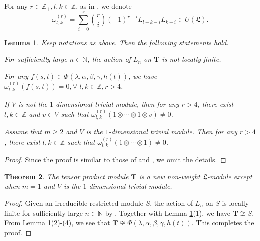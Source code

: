 \documentclass[12pt,leqno,amscd,amsfonts,amssymb]{amsart}
\def\a{\alpha}
\def\b{\beta}
\def\r{\gamma}
\def\Z{\mathbb{Z}}
\def\N{\mathbb{N}}
\numberwithin{equation}{section}
\newtheorem{theo}{Theorem}[section]
\newtheorem{lemm}[theo]{Lemma}
\begin{document}
For any $r\in\Z_+, l, k\in\Z$, as in \cite{LLZ}, we denote
$$\omega_{l,k}^{(r)}=\sum_{i=0}^r\binom{r}{i}(-1)^{r-i}L_{l-k-i}L_{k+i}\in U(\mathfrak L).$$
\begin{lemm}\label{theo123456} Keep notations as above. Then the following statements hold.
\begin{trivlist}
\item[(1)] For sufficiently large $n\in\N$, the action of $L_n$ on  $\bm{T}$ is not locally finite.
\item[(2)] For any $f(s,t) \in \Phi(\lambda, \alpha, \b, \r, h(t))$, we have $\omega_{l,k}^{(r)}(f(s,t)) = 0, \forall\,\, l,k\in\Z, r > 4$.
\item[(3)] If $V$ is not the $1$-dimensional trivial module, then for any  $r>4$, there exist $l, k\in\Z$ and $v\in V$ such that $\omega_{l,k}^{(r)}(1\otimes\cdots\otimes1\otimes v)\neq0$.
\item[(4)] Assume that $m\geq2$ and $V$ is the $1$-dimensional trivial module. Then for any $r>4$, there exist $l, k\in\Z$ such that $\omega_{l,k}^{(r)}(1\otimes\cdots\otimes1)\neq0$.
\end{trivlist}
\end{lemm}
\begin{proof}
Since the proof is similar to those of \cite[Lemma 5.1]{LGW} and \cite[Lemma 4.1]{GLW}, we omit the details.
\end{proof}
\begin{theo}\label{theovvn}
The tensor product module $\bm{T}$ is a new non-weight $\mathfrak L$-module except when $m=1$ and $V$ is the $1$-dimensional trivial module.
\end{theo}
\begin{proof}
Given an irreducible restricted module $S$, the action of $L_n$ on $S$ is locally finite for sufficiently large $n\in\N$ by \cite[Lemma 4.1]{LS}. Together with  Lemma \ref{theo123456}(1), we have $\bm{T}\not\cong S$. From Lemma \ref{theo123456}(2)-(4), we see  that $\bm{T}\not\cong \Phi(\lambda,\a,\b,\r,h(t))$. This completes the proof.
\end{proof}
	
\end{document}
